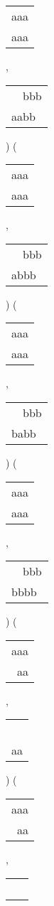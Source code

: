 \begin{description}
\begin{tabular}{|l|}
aaa \\
aaa \\
\hline
\end{tabular} 
 , 
\begin{tabular}{|l|} \hline
\ \ bbb \\
aabb\  \\
\hline
\end{tabular} 
) 
 ( 
\begin{tabular}{|l|} \hline
aaa \\
aaa \\
\hline
\end{tabular} 
 , 
\begin{tabular}{|l|} \hline
\ \ bbb \\
abbb\  \\
\hline
\end{tabular} 
) 
 ( 
\begin{tabular}{|l|} \hline
aaa \\
aaa \\
\hline
\end{tabular} 
 , 
\begin{tabular}{|l|} \hline
\ \ bbb \\
babb\  \\
\hline
\end{tabular} 
) 
 ( 
\begin{tabular}{|l|} \hline
aaa \\
aaa \\
\hline
\end{tabular} 
 , 
\begin{tabular}{|l|} \hline
\ \ bbb \\
bbbb\  \\
\hline
\end{tabular} 
) 
 ( 
\begin{tabular}{|l|} \hline
aaa \\
\ aa \\
\hline
\end{tabular} 
 , 
\begin{tabular}{|l|} \hline
\ \  \\
aa \\
\hline
\end{tabular} 
) 
 ( 
\begin{tabular}{|l|} \hline
aaa \\
\ aa \\
\hline
\end{tabular} 
 , 
\begin{tabular}{|l|} \hline
\ \  \\

\end{tabular}
\end{description}
